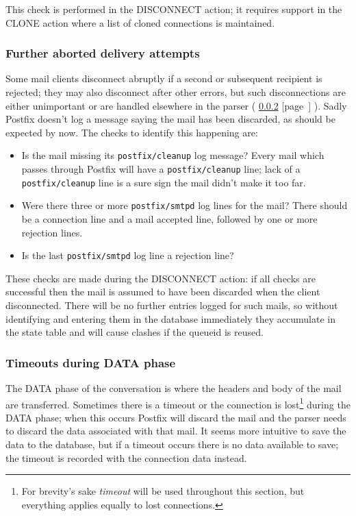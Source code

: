 \documentclass[a4paper,12pt,draft]{article}
\newcommand{\refwithpage}[1]{%
    \empty{}\ref{#1} [page~\pageref{#1}]%
}
\newcommand{\sectionref}[1]{%
    \textsection{}\refwithpage{#1}%
}
\newcommand{\daemon}[1]{%
    \texttt{postfix/#1}%
}
\begin{document}
This check is performed in the DISCONNECT action; it requires support in
the CLONE action where a list of cloned connections is maintained.

\subsubsection{Further aborted delivery attempts}

Some mail clients disconnect abruptly if a second or subsequent recipient
is rejected; they may also disconnect after other errors, but such
disconnections are either unimportant or are handled elsewhere in the
parser (\sectionref{timeouts-during-data-phase}).  Sadly Postfix doesn't
log a message saying the mail has been discarded, as should be expected by
now.  The checks to identify this happening are:

\begin{itemize}

    \item Is the mail missing its \daemon{cleanup} log message?  Every mail
        which passes through Postfix will have a \daemon{cleanup} line;
        lack of a \daemon{cleanup} line is a sure sign the mail didn't make
        it too far.

    \item Were there three or more \daemon{smtpd} log lines for the mail?
        There should be a connection line and a mail accepted line,
        followed by one or more rejection lines.

    \item Is the last \daemon{smtpd} log line a rejection line?

\end{itemize}

These checks are made during the DISCONNECT action: if all checks are
successful then the mail is assumed to have been discarded when the client
disconnected.  There will be no further entries logged for such mails, so
without identifying and entering them in the database immediately they
accumulate in the state table and will cause clashes if the queueid is
reused.

\subsubsection{Timeouts during DATA phase}

\label{timeouts-during-data-phase}

The DATA phase of the \SMTP{} conversation is where the headers and body of
the mail are transferred.  Sometimes there is a timeout or the connection
is lost\footnote{For brevity's sake \textit{timeout\/} will be used
throughout this section, but everything applies equally to lost
connections.} during the DATA phase; when this occurs Postfix will discard
the mail and the parser needs to discard the data associated with that
mail.  It seems more intuitive to save the data to the database, but if a
timeout occurs there is no data available to save; the timeout is recorded
with the connection data instead.
\end{document}
